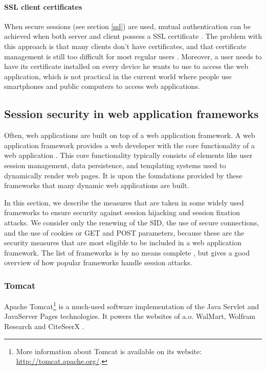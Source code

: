\paragraph{SSL client certificates}\label{certificates}
When secure sessions (see section \ref{ssl}) are used, mutual authentication can be achieved when both server and client possess a SSL certificate \cite{Park2000}. The problem with this approach is that many clients don't have certificates, and that certificate management is still too difficult for most regular users \cite{Whitten1999}. Moreover, a user needs to have its certificate installed on every device he wants to use to access the web application, which is not practical in the current world where people use smartphones and public computers to access web applications.

\subsection{Session security in web application frameworks}\label{frameworks}

Often, web applications are built on top of a web application framework. A \gls{web application framework} provides a web developer with the core functionality of a web application \cite{Schwartz2010}. This core functionality typically consists of elements like user session management, data persistence, and templating systems used to dynamically render web pages. It is upon the foundations provided by these frameworks that many dynamic web applications are built.

In this section, we describe the measures that are taken in some widely used frameworks to ensure security against session hijacking and session fixation attacks. We consider only the renewing of the SID, the use of secure connections, and the use of cookies or GET and POST parameters, because these are the security measures that are most eligible to be included in a web application framework. The list of frameworks is by no means complete \cite{FrameworksComparison}, but gives a good overview of how popular frameworks handle session attacks.

\subsubsection{Tomcat}

Apache Tomcat\footnote{More information about Tomcat is available on its website: \url{http://tomcat.apache.org/}.} is a much-used software implementation of the Java Servlet and JavaServer Pages technologies. It powers the websites of a.o. WalMart, Wolfram Research and CiteSeerX \cite{TomcatPoweredBy}.


